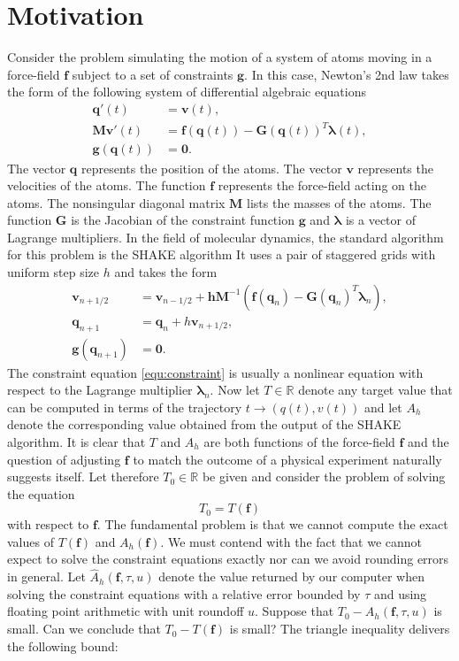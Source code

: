 \documentclass[runningheads]{llncs}
\begin{document}
\section{Motivation} Consider the problem simulating the motion of a system of atoms moving in a force-field $\bm{f}$ subject to a set of constraints $\bm{g}$. In this case, Newton's 2nd law takes the form of the following system of differential algebraic equations
\begin{align}
  \bm{q}'(t) &= \bm{v}(t), \\
  \bm{M}\bm{v}'(t) &= \bm{f}(\bm{q}(t)) - \bm{G}(\bm{q}(t))^T\bm{\lambda}(t), \\
  \bm{g}(\bm{q}(t)) &= \bm{0}. 
\end{align}
The vector $\bm{q}$ represents the position of the atoms.
The vector $\bm{v}$ represents the velocities of the atoms. The function $\bm{f}$ represents the force-field acting on the atoms.
The nonsingular diagonal matrix $\bm{M}$ lists the masses of the atoms.
The function $\bm{G}$ is the Jacobian of the constraint function $\bm{g}$ and $\bm{\lambda}$ is a vector of Lagrange multipliers.
In the field of molecular dynamics, the standard algorithm for this problem is the SHAKE algorithm \cite{shake1977}
It uses a pair of staggered grids with uniform step size $h$ and takes the form
\begin{align}
  \bm{v}_{n+1/2} &= \bm{v}_{n-1/2} + \bm{h} \bm{M}^{-1} \left( \bm{f}(\bm{q}_n) - \bm{G}(\bm{q}_n)^T \bm{\lambda}_n \right), \\
  \bm{q}_{n+1} &= \bm{q}_n + h \bm{v}_{n + 1/2}, \\
  \bm{g}(\bm{q}_{n+1}) &= \bm{0}. \label{equ:constraint}
\end{align}
The constraint equation \eqref{equ:constraint} is usually a nonlinear equation with respect to the Lagrange multiplier $\bm{\lambda}_n$. 
Now let $T \in \mathbb{R}$ denote any target value that can be computed in terms of the trajectory $t \rightarrow (q(t), v(t))$ and let $A_h$ denote the corresponding value obtained from the output of the SHAKE algorithm. It is clear that $T$ and $A_h$ are both functions of the force-field $\bm{f}$ and the question of adjusting $\bm{f}$ to match the outcome of a physical experiment naturally suggests itself. Let therefore $T_0 \in \mathbb{R}$ be given and consider the problem of solving the equation
\begin{equation}
  T_0 = T(\bm{f})
\end{equation}
with respect to $\bm{f}$. The fundamental problem is that we cannot compute the exact values of $T(\bm{f})$ and $A_h(\bm{f})$. We must contend with the fact that we cannot expect to solve the constraint equations exactly nor can we avoid rounding errors in general. Let $\hat{A}_h(\bm{f}, \tau, u)$ denote the value returned by our computer when solving the constraint equations with a relative error bounded by $\tau$ and using floating point arithmetic with unit roundoff $u$. Suppose that $T_0 - A_h(\bm{f}, \tau, u)$ is small. Can we conclude that $T_0 - T(\bm{f})$ is small? The triangle inequality delivers the following bound:
\end{document}
